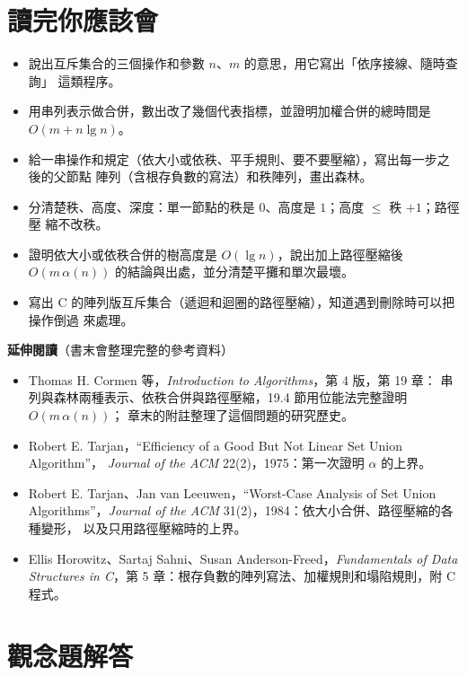 \section{讀完你應該會}
\label{sec:ds-checklist}

\begin{itemize}
\item 說出互斥集合的三個操作和參數 $n$、$m$ 的意思，用它寫出「依序接線、隨時查詢」
這類程序。
\item 用串列表示做合併，數出改了幾個代表指標，並證明加權合併的總時間是 $O(m + n \lg
n)$。
\item 給一串操作和規定（依大小或依秩、平手規則、要不要壓縮），寫出每一步之後的父節點
陣列（含根存負數的寫法）和秩陣列，畫出森林。
\item 分清楚秩、高度、深度：單一節點的秩是 $0$、高度是 $1$；高度 $\le$ 秩 $+ 1$；路徑壓
縮不改秩。
\item 證明依大小或依秩合併的樹高度是 $O(\lg n)$，說出加上路徑壓縮後 $O(m\,\alpha(n))$
的結論與出處，並分清楚平攤和單次最壞。
\item 寫出 C 的陣列版互斥集合（遞迴和迴圈的路徑壓縮），知道遇到刪除時可以把操作倒過
來處理。
\end{itemize}

\textbf{延伸閱讀}（書末會整理完整的參考資料）

\begin{itemize}
\item Thomas H. Cormen 等，\textit{Introduction to Algorithms}，第 4 版，第 19 章：
串列與森林兩種表示、依秩合併與路徑壓縮，19.4 節用位能法完整證明 $O(m\,\alpha(n))$；
章末的附註整理了這個問題的研究歷史。
\item Robert E. Tarjan，``Efficiency of a Good But Not Linear Set Union Algorithm''，
\textit{Journal of the ACM} 22(2)，1975：第一次證明 $\alpha$ 的上界。
\item Robert E. Tarjan、Jan van Leeuwen，``Worst-Case Analysis of Set Union
Algorithms''，\textit{Journal of the ACM} 31(2)，1984：依大小合併、路徑壓縮的各種變形，
以及只用路徑壓縮時的上界。
\item Ellis Horowitz、Sartaj Sahni、Susan Anderson-Freed，\textit{Fundamentals of Data
Structures in C}，第 5 章：根存負數的陣列寫法、加權規則和塌陷規則，附 C 程式。
\end{itemize}

\section*{觀念題解答}

